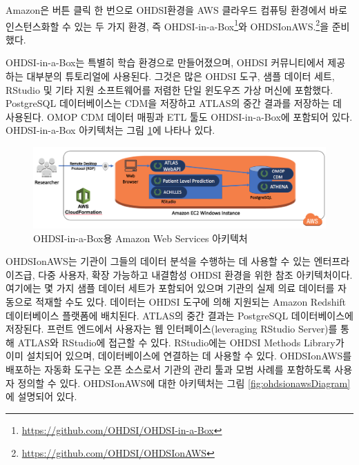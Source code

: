 \documentclass[11pt]{book}
\let\rmarkdownfootnote\footnote%
\def\footnote{\protect\rmarkdownfootnote}
\theoremstyle{definition}
\theoremstyle{definition}
\theoremstyle{definition}
\theoremstyle{remark}
\begin{document}
Amazon은 버튼 클릭 한 번으로 OHDSI환경을 AWS 클라우드 컴퓨팅 환경에서
바로 인스턴스화할 수 있는 두 가지 환경, 즉 OHDSI-in-a-Box\footnote{\url{https://github.com/OHDSI/OHDSI-in-a-Box}}와
OHDSIonAWS.\footnote{\url{https://github.com/OHDSI/OHDSIonAWS}}을
준비했다. 

OHDSI-in-a-Box는 특별히 학습 환경으로 만들어졌으며, OHDSI 커뮤니티에서
제공하는 대부분의 튜토리얼에 사용된다. 그것은 많은 OHDSI 도구, 샘플
데이터 세트, RStudio 및 기타 지원 소프트웨어를 저렴한 단일 윈도우즈 가상
머신에 포함했다. PostgreSQL 데이터베이스는 CDM을 저장하고 ATLAS의 중간
결과를 저장하는 데 사용된다. OMOP CDM 데이터 매핑과 ETL 툴도
OHDSI-in-a-Box에 포함되어 있다. OHDSI-in-a-Box 아키텍처는 그림
\ref{fig:ohdsiinaboxDiagram}에 나타나 있다.

\begin{figure}

{\centering \includegraphics[width=1\linewidth]{images/OhdsiAnalyticsTools/OHDSI-in-a-BoxDiagram} 

}

\caption{OHDSI-in-a-Box용 Amazon Web Services 아키텍처}\label{fig:ohdsiinaboxDiagram}
\end{figure}

OHDSIonAWS는 기관이 그들의 데이터 분석을 수행하는 데 사용할 수 있는
엔터프라이즈급, 다중 사용자, 확장 가능하고 내결함성 OHDSI 환경을 위한
참조 아키텍처이다. 여기에는 몇 가지 샘플 데이터 세트가 포함되어 있으며
기관의 실제 의료 데이터를 자동으로 적재할 수도 있다. 데이터는 OHDSI
도구에 의해 지원되는 Amazon Redshift 데이터베이스 플랫폼에 배치된다.
ATLAS의 중간 결과는 PostgreSQL 데이터베이스에 저장된다. 프런트 엔드에서
사용자는 웹 인터페이스(leveraging RStudio Server)를 통해 ATLAS와
RStudio에 접근할 수 있다. RStudio에는 OHDSI Methods Library가 이미
설치되어 있으며, 데이터베이스에 연결하는 데 사용할 수 있다. OHDSIonAWS를
배포하는 자동화 도구는 오픈 소스로서 기관의 관리 툴과 모범 사례를
포함하도록 사용자 정의할 수 있다. OHDSIonAWS에 대한 아키텍처는 그림
\ref{fig:ohdsionawsDiagram}에 설명되어 있다.
\end{document}
